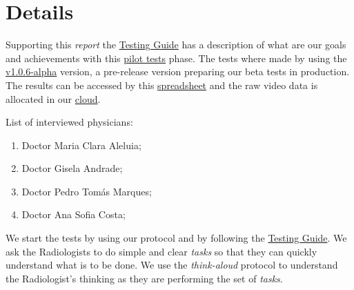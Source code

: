 
\section*{Details}

Supporting this \textit{report} the \hyperlink{https://github.com/MIMBCD-UI/testing-guide-breast/tree/master/samples/test_3}{Testing Guide} has a description of what are our goals and achievements with this \hyperlink{https://www.nngroup.com/articles/pilot-testing/}{pilot tests} phase. The tests where made by using the \hyperlink{https://github.com/MIMBCD-UI/prototype-breast-screening/releases/tag/v1.0.6-alpha}{v1.0.6-alpha} version, a pre-release version preparing our beta tests in production. The results can be accessed by this \hyperlink{https://docs.google.com/spreadsheets/d/1WwbvDO5Iz39Jr6H2ZzPth1o9DqhmpQz10Vtao7rvjfQ/edit?usp=sharing}{spreadsheet} and the raw video data is allocated in our \hyperlink{https://ulisboa-my.sharepoint.com/:f:/g/personal/francisco_calisto_office365_ulisboa_pt/EvTuVe-jyClHgNYUvCXJ1YYBUIYAKlFdjOwCDU1X5F71Kw?e=9IC0Dy}{cloud}.

\hfill


List of interviewed physicians:


\hfill

\begin{enumerate}
\item Doctor Maria Clara Aleluia;
\item Doctor Gisela Andrade;
\item Doctor Pedro Tom\'{a}s Marques;
\item Doctor Ana Sofia Costa;
\end{enumerate}

\hfill


We start the tests by using our protocol and by following the \hyperlink{https://github.com/MIMBCD-UI/testing-guide-breast/tree/master/samples/test_3}{Testing Guide}. We ask the Radiologists to do simple and clear \textit{tasks} so that they can quickly understand what is to be done. We use the \textit{think-aloud} protocol to understand the Radiologist's thinking as they are performing the set of \textit{tasks}.

